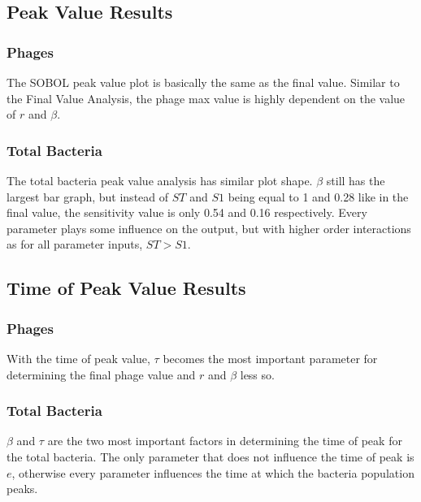 \subsection{Peak Value Results}
\subsubsection{Phages}
The SOBOL peak value plot is basically the same as the final value. 
Similar to the Final Value Analysis, the phage max value is highly dependent on the value of $r$ and $\beta$. 
\subsubsection{Total Bacteria}
The total bacteria peak value analysis has similar plot shape. 
$\beta$ still has the largest bar graph, but instead of $ST$ and $S1$ being equal to 1 and 0.28 like in the final value, the sensitivity value is only 0.54 and 0.16 respectively. 
Every parameter plays some influence on the output, but with higher order interactions as for all parameter inputs, $ST > S1$. 

\subsection{Time of Peak Value Results}
\subsubsection{Phages}
With the time of peak value, $\tau$ becomes the most important parameter for determining the final phage value and $r$ and $\beta$ less so. 
\subsubsection{Total Bacteria}
$\beta$ and $\tau$ are the two most important factors in determining the time of peak for the total bacteria. 
The only parameter that does not influence the time of peak is $e$, otherwise every parameter influences the time at which the bacteria population peaks. 

